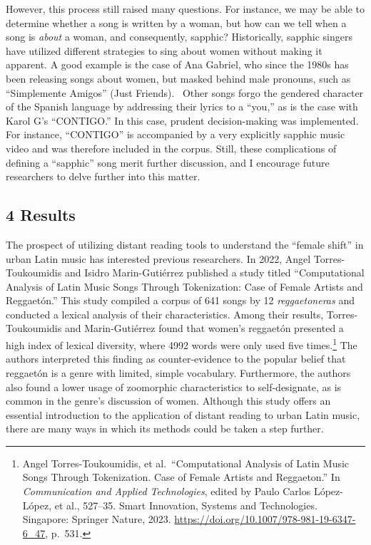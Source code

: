 \documentclass[
  letterpaper,
  DIV=11,
  numbers=noendperiod]{scrartcl}
\begin{document}
However, this process still raised many questions. For instance, we may
be able to determine whether a song is written by a woman, but how can
we tell when a song is \emph{about} a woman, and consequently, sapphic?
Historically, sapphic singers have utilized different strategies to sing
about women without making it apparent. A good example is the case of
Ana Gabriel, who since the 1980s has been releasing songs about women,
but masked behind male pronouns, such as ``Simplemente Amigos'' (Just
Friends). ~Other songs forgo the gendered character of the Spanish
language by addressing their lyrics to a ``you,'' as is the case with
Karol G's ``CONTIGO.'' In this case, prudent decision-making was
implemented. For instance, ``CONTIGO'' is accompanied by a very
explicitly sapphic music video and was therefore included in the corpus.
Still, these complications of defining a ``sapphic'' song merit further
discussion, and I encourage future researchers to delve further into
this matter.

\hypertarget{results}{%
\subsection{\texorpdfstring{4
\textbf{Results}}{4 Results}}\label{results}}

The prospect of utilizing distant reading tools to understand the
``female shift'' in urban Latin music has interested previous
researchers. In 2022, Angel Torres-Toukoumidis and Isidro
Marin-Gutiérrez published a study titled ``Computational Analysis of
Latin Music Songs Through Tokenization: Case of Female Artists and
Reggaetón.'' This study compiled a corpus of 641 songs by 12
\emph{reggaetoneras} and conducted a lexical analysis of their
characteristics. Among their results, Torres-Toukoumidis and
Marin-Gutiérrez found that women's reggaetón presented a high index of
lexical diversity, where 4992 words were only used five
times.\footnote{Angel Torres-Toukoumidis, et al.~``Computational
  Analysis of Latin Music Songs Through Tokenization. Case of Female
  Artists and Reggaeton.'' In \emph{Communication and Applied
  Technologies}, edited by Paulo Carlos López-López, et al., 527--35.
  Smart Innovation, Systems and Technologies. Singapore: Springer
  Nature, 2023. \url{https://doi.org/10.1007/978-981-19-6347-6_47},
  p.~531.} The authors interpreted this finding as counter-evidence to
the popular belief that reggaetón is a genre with limited, simple
vocabulary. Furthermore, the authors also found a lower usage of
zoomorphic characteristics to self-designate, as is common in the
genre's discussion of women. Although this study offers an essential
introduction to the application of distant reading to urban Latin music,
there are many ways in which its methods could be taken a step further.
\end{document}
